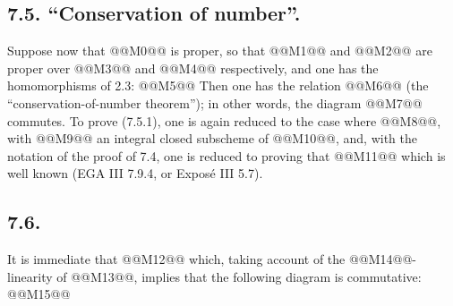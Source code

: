 
\subsection*{7.5. ``Conservation of number''.}
Suppose now that @@M0@@ is proper, so that @@M1@@ and @@M2@@ are proper over @@M3@@ and @@M4@@ respectively, and one has the homomorphisms of 2.3:
@@M5@@
Then one has the relation
@@M6@@
(the ``conservation-of-number theorem''); in other words, the diagram
@@M7@@
commutes. To prove (7.5.1), one is again reduced to the case where @@M8@@, with @@M9@@ an integral closed subscheme of @@M10@@, and, with the notation of the proof of 7.4, one is reduced to proving that
@@M11@@
which is well known (EGA III 7.9.4, or Exposé III 5.7).

\subsection*{7.6.}
It is immediate that
@@M12@@
which, taking account of the @@M14@@-linearity of @@M13@@, implies that the following diagram is commutative:
@@M15@@
